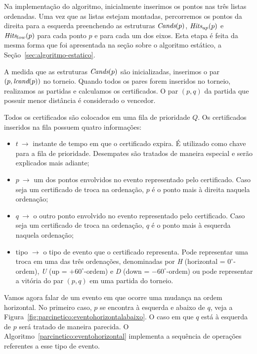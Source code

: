 Na implementação do algoritmo, inicialmente inserimos os pontos nas três listas ordenadas.
Uma vez que as listas estejam montadas, percorremos os pontos da direita para a esquerda
preenchendo as estruturas $\textit{Cands}(p)$, $\textit{Hits}_{up}(p)$ e $\textit{Hits}_{low}(p)$ para cada ponto $p$ e
para cada um dos eixos.
Esta etapa é feita da mesma forma que foi apresentada na seção sobre o algoritmo estático, a
Seção~\ref{sec:algoritmo-estatico}.

A medida que as estruturas $\textit{Cands}(p)$ são inicializadas, inserimos o par $(p, \textit{lcand}(p))$ no
torneio.
Quando todos os pares forem inseridos no torneio, realizamos as partidas e calculamos os
certificados.
O par $(p, q)$ da partida que possuir menor distância é considerado o vencedor.

Todos os certificados são colocados em uma fila de prioridade $Q$.
Os certificados inseridos na fila possuem quatro informações:
\begin{itemize}
    \item $t~\rightarrow$ instante de tempo em que o certificado
    expira.
    É utilizado como chave para a fila de prioridade.
    Desempates são tratados de maneira especial e serão explicados
    mais adiante;
    \item $p~\rightarrow$ um dos pontos envolvidos no evento
    representado pelo certificado.
    Caso seja um certificado de troca na ordenação, $p$ é o ponto mais à direita naquela ordenação;
    \item $q~\rightarrow$ o outro ponto envolvido no evento representado pelo certificado.
    Caso seja um certificado de troca na ordenação, $q$ é o ponto mais à esquerda naquela
    ordenação;
    \item tipo $ \rightarrow$ o tipo de evento que o certificado representa.
    Pode representar uma troca em uma das três ordenações, denominadas por \textit{H} (horizontal =
    $0^\circ$-ordem), \textit{U} (up = $+60^\circ$-ordem) e \textit{D} (down = $-60^\circ$-ordem) ou pode
    representar a vitória do par $(p, q)$ em uma partida do torneio.
\end{itemize}

Vamos agora falar de um evento em que ocorre uma mudança na ordem horizontal.
No primeiro caso, $p$ se encontra à esquerda e abaixo de $q$, veja a
Figura~\ref{fig:parcinetico:eventohorizontalabaixo}.
O caso em que $q$ está à esquerda de $p$ será tratado de maneira parecida.
O Algoritmo~\ref{parcinetico:eventohorizontal} implementa a sequência de operações referentes a
esse tipo de evento.

